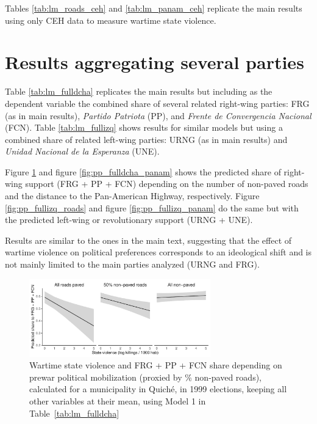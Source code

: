 \documentclass[a4paper, 12pt, notitlepage]{article}
\begin{document}
Tables \ref{tab:lm_roads_ceh} and \ref{tab:lm_panam_ceh} replicate the main results using only CEH data to measure wartime state violence.




\clearpage
\section{Results aggregating several parties}\label{app:results_full}

Table \ref{tab:lm_fulldcha} replicates the main results but including as the dependent variable the combined share of several related right-wing parties: FRG (as in main results), \textit{Partido Patriota} (PP), and \textit{Frente de Convergencia Nacional} (FCN).
Table \ref{tab:lm_fullizq} shows results for similar models but using a combined share of related left-wing parties: URNG (as in main results) and \textit{Unidad Nacional de la Esperanza} (UNE).

Figure \ref{fig:pp_fulldcha_roads} and figure \ref{fig:pp_fulldcha_panam} shows the predicted share of right-wing support (FRG + PP + FCN) depending on the number of non-paved roads and the distance to the Pan-American Highway, respectively.
Figure \ref{fig:pp_fullizq_roads} and figure \ref{fig:pp_fullizq_panam} do the same but with the predicted left-wing or revolutionary support (URNG + UNE).

Results are similar to the ones in the main text, suggesting that the effect of wartime violence on political preferences corresponds to an ideological shift and is not mainly limited to the main parties analyzed (URNG and FRG).




\clearpage
\begin{figure}[htb!]
  \centering
    \includegraphics[width = 0.7\textwidth]{img/pp_fulldcha_roads}

  \caption{Wartime state violence and FRG + PP + FCN share depending on prewar political mobilization (proxied by \% non-paved roads), calculated for a municipality in Quiché, in 1999 elections, keeping all other variables at their mean, using Model 1 in Table~\ref{tab:lm_fulldcha}} \label{fig:pp_fulldcha_roads}

\end{figure}
\end{document}
